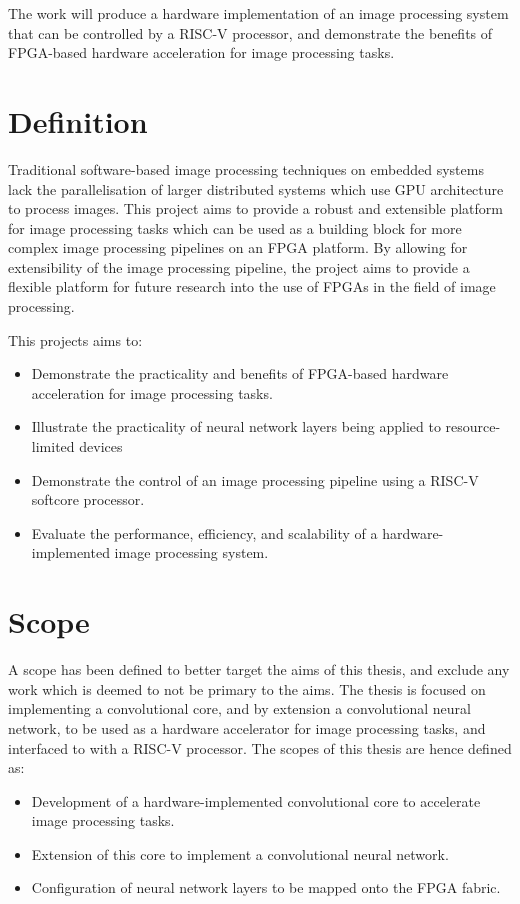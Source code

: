 The work will produce a hardware implementation of an image processing system that can be controlled by a RISC-V processor, and demonstrate the benefits of FPGA-based hardware acceleration for image processing tasks.

\section{Definition}

Traditional software-based image processing techniques on embedded systems lack the parallelisation of larger distributed systems which use GPU architecture to process images.
This project aims to provide a robust and extensible platform for image processing tasks which can be used as a building block for more complex image processing pipelines on an FPGA platform.
By allowing for extensibility of the image processing pipeline, the project aims to provide a flexible platform for future research into the use of FPGAs in the field of image processing.

This projects aims to:
\begin{itemize}
    \item Demonstrate the practicality and benefits of FPGA-based hardware acceleration for image processing tasks.
    \item Illustrate the practicality of neural network layers being applied to resource-limited devices
    \item Demonstrate the control of an image processing pipeline using a RISC-V softcore processor.
    \item Evaluate the performance, efficiency, and scalability of a hardware-implemented image processing system.
\end{itemize}

\section{Scope}

A scope has been defined to better target the aims of this thesis, and exclude any work which is deemed to not be primary to the aims.
The thesis is focused on implementing a convolutional core, and by extension a convolutional neural network, to be used as a hardware accelerator for image processing tasks, and interfaced to with a RISC-V processor.
The scopes of this thesis are hence defined as:

\begin{itemize}
    \item Development of a hardware-implemented convolutional core to accelerate image processing tasks.
    \item Extension of this core to implement a convolutional neural network.
    \item Configuration of neural network layers to be mapped onto the FPGA fabric.
\end{itemize}


